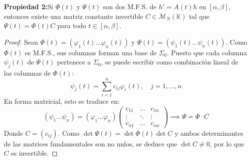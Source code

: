 \begin{proposición}
\textbf{Propiedad 2:}Si $\Phi(t)$ y $\Psi(t)$ son dos M.F.S. de $h' = A(t)h$ en $[\alpha, \beta]$, entonces existe una matriz constante invertible $C \in \mathcal{M}_N(\mathbb{K})$ tal que $\Psi(t) = \Phi(t)C$ para todo $t \in [\alpha, \beta]$.
\end{proposición}

\begin{proof}
Sean $\Phi(t) = (\varphi_1(t) \dots \varphi_n(t))$ y $\Psi(t) = (\psi_1(t) \dots \psi_n(t))$. 
Como $\Phi(t)$ es M.F.S., sus columnas forman una base de $\Sigma_0$. Puesto que cada columna $\psi_j(t)$ de $\Psi(t)$ pertenece a $\Sigma_0$, se puede escribir como combinación lineal de las columnas de $\Phi(t)$:
\[ \psi_j(t) = \sum_{i=1}^n c_{ij} \varphi_i(t), \quad j = 1, \dots, n \text{} \]
En forma matricial, esto se traduce en:
\[ (\psi_1 \dots \psi_n) = (\varphi_1 \dots \varphi_n) \begin{pmatrix} c_{11} & \dots & c_{1n} \\ \vdots & \ddots & \vdots \\ c_{n1} & \dots & c_{nn} \end{pmatrix} \implies \Psi = \Phi \cdot C \text{} \]
Donde $C = (c_{ij})$. Como $\det \Psi(t) = \det \Phi(t) \det C$ y ambos determinantes de las matrices fundamentales son no nulos, se deduce que $\det C \neq 0$, por lo que $C$ es invertible.
\end{proof}

